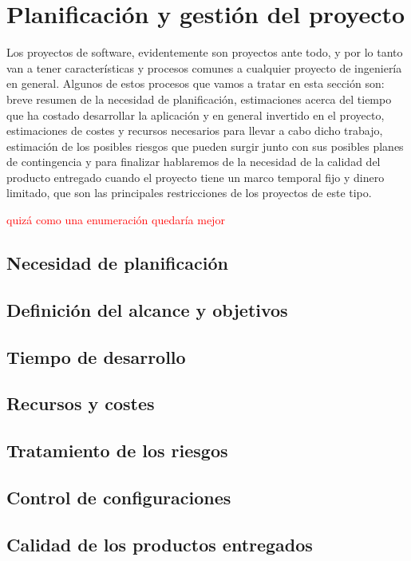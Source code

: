 \section{Planificación y gestión del proyecto}
\setlength{\parskip}{0.5cm}

Los proyectos de software, evidentemente son proyectos ante todo, y por lo tanto van a tener características y procesos comunes a cualquier proyecto de ingeniería en general. Algunos de estos procesos que vamos a tratar en esta sección son: breve resumen de la necesidad de planificación, estimaciones acerca del tiempo que ha costado desarrollar la aplicación y en general invertido en el proyecto, estimaciones de costes y recursos necesarios para llevar a cabo dicho trabajo, estimación de los posibles riesgos que pueden surgir junto con sus posibles planes de contingencia y para finalizar hablaremos de la necesidad de la calidad del producto entregado cuando el proyecto tiene un marco temporal fijo y dinero limitado, que son las principales restricciones de los proyectos de este tipo. 

\textcolor{red}{quizá como una enumeración quedaría mejor}

\subsection{Necesidad de planificación}


\subsection{Definición del alcance y objetivos}


\subsection{Tiempo de desarrollo}


\subsection{Recursos y costes}


\subsection{Tratamiento de los riesgos}


\subsection{Control de configuraciones}


\subsection{Calidad de los productos entregados}
